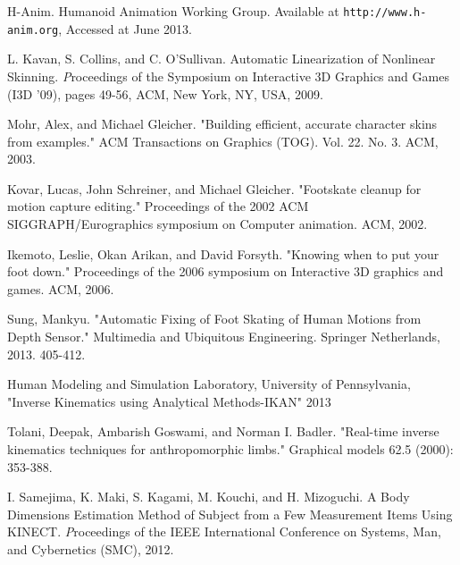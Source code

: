 \documentclass[number,preprint,review,12pt]{elsarticle}
\begin{document}
\begin{thebibliography}{}
H-Anim. Humanoid Animation Working Group. Available at \verb+http://www.h-anim.org+, Accessed at June 2013.

L. Kavan, S. Collins, and C. O'Sullivan. Automatic Linearization of Nonlinear Skinning. {\textit Proceedings of the Symposium on Interactive 3D Graphics and Games (I3D '09)}, pages 49-56, ACM, New York, NY, USA, 2009.

Mohr, Alex, and Michael Gleicher. "Building efficient, accurate character skins from examples." ACM Transactions on Graphics (TOG). Vol. 22. No. 3. ACM, 2003.

Kovar, Lucas, John Schreiner, and Michael Gleicher. "Footskate cleanup for motion capture editing." Proceedings of the 2002 ACM SIGGRAPH/Eurographics symposium on Computer animation. ACM, 2002.

Ikemoto, Leslie, Okan Arikan, and David Forsyth. "Knowing when to put your foot down." Proceedings of the 2006 symposium on Interactive 3D graphics and games. ACM, 2006.

Sung, Mankyu. "Automatic Fixing of Foot Skating of Human Motions from Depth Sensor." Multimedia and Ubiquitous Engineering. Springer Netherlands, 2013. 405-412.

Human Modeling and Simulation Laboratory, University of Pennsylvania, "Inverse Kinematics using Analytical Methods-IKAN" 2013

Tolani, Deepak, Ambarish Goswami, and Norman I. Badler. "Real-time inverse kinematics techniques for anthropomorphic limbs." Graphical models 62.5 (2000): 353-388.

I. Samejima, K. Maki, S. Kagami, M. Kouchi, and H. Mizoguchi. A Body Dimensions Estimation Method of Subject from a Few Measurement Items Using KINECT. {\textit Proceedings of the IEEE International Conference on Systems, Man, and Cybernetics (SMC)}, 2012.

\end{thebibliography}
\end{document}
